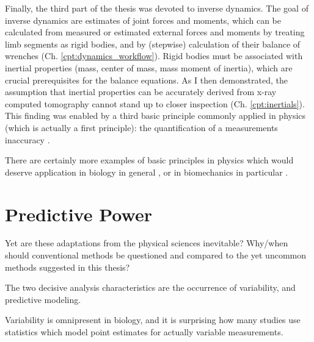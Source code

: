 Finally, the third part of the thesis was devoted to inverse dynamics.
The goal of inverse dynamics are estimates of joint forces and moments, which can be calculated from measured or estimated external forces and moments by treating limb segments as rigid bodies, and by (stepwise) calculation of their balance of wrenches (Ch. \ref{cpt:dynamics_workflow}).
Rigid bodies must be associated with inertial properties (mass, center of mass, mass moment of inertia), which are crucial prerequisites for the balance equations.
As I then demonstrated, the assumption that inertial properties can be accurately derived from x-ray computed tomography cannot stand up to closer inspection (Ch. \ref{cpt:inertials}).
This finding was enabled by a third basic principle commonly applied in physics (which is actually a first principle): the quantification of a measurements inaccuracy \citep{Hughes2010}.


There are certainly more examples of basic principles in physics which would deserve application in biology in general \citep[e.g. Quantum Cognition,][]{Busemeyer2015,Aerts1995}, or in biomechanics in particular \citep[e.g. wrenches and quaternions,][]{Dumas2004}.


\section{Predictive Power}
\label{sec:org0f0c44f}
Yet are these adaptations from the physical sciences inevitable?
Why/when should conventional methods be questioned and compared to the yet uncommon methods suggested in this thesis?


The two decisive analysis characteristics are the occurrence of variability, and predictive modeling.

Variability is omnipresent in biology, and it is surprising how many studies use statistics which model point estimates for actually variable measurements.

